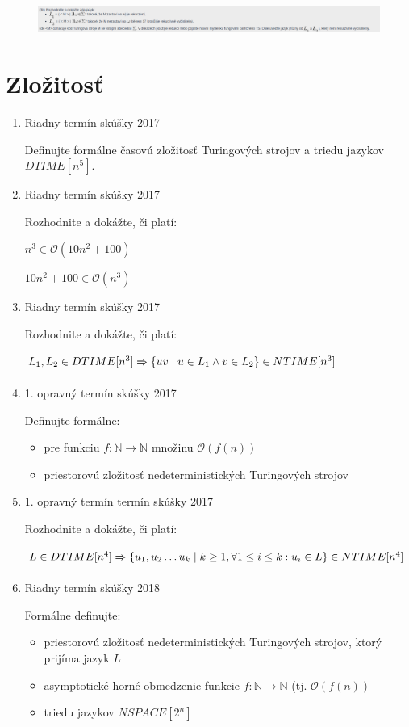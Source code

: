 \documentclass[]{article}
\begin{document}
	\begin{figure}[H]
		\includegraphics[width=\textwidth]{tasks/redukcie/task8.png}
	\end{figure}
	
	\section{Zložitosť}
	
	\begin{enumerate}
		\item Riadny termín skúšky 2017
		
		Definujte formálne časovú zložitosť Turingových strojov a triedu jazykov $DTIME[n^5]$.
		
		\item Riadny termín skúšky 2017
		
		Rozhodnite a dokážte, či platí:
		
		$n^3 \in \mathcal{O}(10n^2 + 100)$
		
		$10n^2 + 100 \in \mathcal{O}(n^3)$
		
		\item Riadny termín skúšky 2017
		
		Rozhodnite a dokážte, či platí:
		
		$L_1, L_2 \in DTIME[n^3] \xRightarrow[]{} \{ uv \mid u \in  L_1 \land v \in L_2\} \in NTIME[n^3]$
		
		\item 1. opravný termín skúšky 2017
		
		Definujte formálne:
		
		\begin{itemize}
			\item pre funkciu $f: \mathbb{N} \rightarrow \mathbb{N}$ množinu $\mathcal{O}(f(n))$
			\item priestorovú zložitosť nedeterministických Turingových strojov
		\end{itemize}
	
		\item 1. opravný termín termín skúšky 2017
		
		Rozhodnite a dokážte, či platí:
		
		$L \in DTIME[n^4] \xRightarrow[]{} \{ u_1, u_2 \ldots u_k \mid k \geq 1, \forall 1 \leq i \leq k: u_i \in L\} \in NTIME[n^4]$
		
		\item Riadny termín skúšky 2018
		
		Formálne definujte:
		
		\begin{itemize}
			\item priestorovú zložitosť nedeterministických Turingových strojov, ktorý prijíma jazyk $L$
			\item asymptotické horné obmedzenie funkcie $f: \mathbb{N} \rightarrow \mathbb{N}$ (tj. $\mathcal{O}(f(n))$
			\item triedu jazykov $NSPACE[2^n]$
		\end{itemize}
	\end{enumerate}
\end{document}
